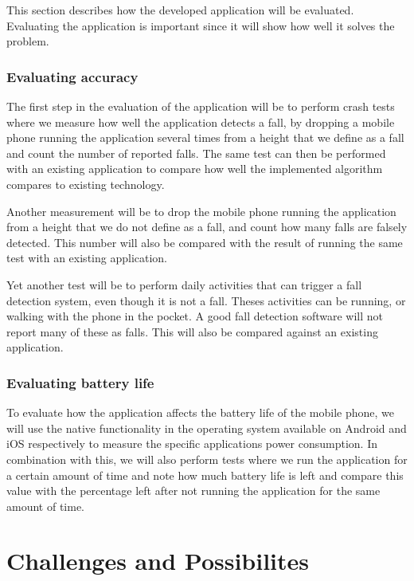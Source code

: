 \documentclass[12pt, a4paper, onecolumn]{article}
\begin{document}
	This section describes how the developed application will be evaluated. Evaluating the application is important since it will show how well it solves the problem.
	
	\subsubsection{Evaluating accuracy}
	
	The first step in the evaluation of the application will be to perform crash tests where we measure how well the application detects a fall, by dropping a mobile phone running the application several times from a height that we define as a fall and count the number of reported falls. The same test can then be performed with an existing application to compare how well the implemented algorithm compares to existing technology.
	
	Another measurement will be to drop the mobile phone running the application from a height that we do not define as a fall, and count how many falls are falsely detected. This number will also be compared with the result of running the same test with an existing application.
	
	Yet another test will be to perform daily activities that can trigger a fall detection system, even though it is not a fall. Theses activities can be running, or walking with the phone in the pocket. A good fall detection software will not report many of these as falls. This will also be compared against an existing application.
	
	\subsubsection{Evaluating battery life}
	
	To evaluate how the application affects the battery life of the mobile phone, we will use the native functionality in the operating system available on Android and iOS respectively to measure the specific applications power consumption.
	In combination with this, we will also perform tests where we run the application for a certain amount of time and note how much battery life is left and compare this value with the percentage left after not running the application for the same amount of time.
	
	\newpage
	\section{Challenges and Possibilites}
	
\end{document}
